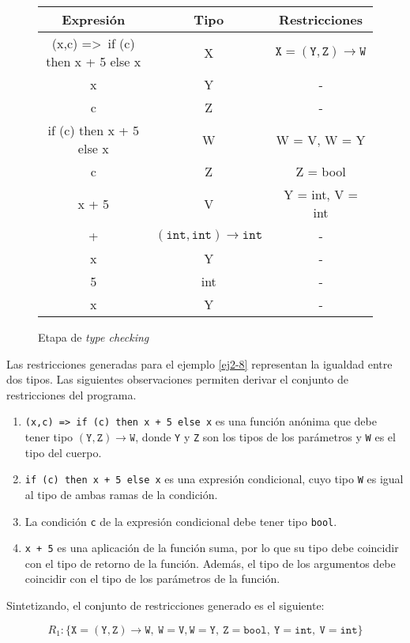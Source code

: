\begin{figure}[ht]
  \centering
  \ttfamily
  \begin{tabular}{c c c}
    Expresión & Tipo & Restricciones\\
    \hline
    (x,c) =>\ if (c) then x + 5 else x & X & $\mathtt{X = (Y,Z) \rightarrow W}$\\
    x & Y & -\\
    c & Z & -\\
    if (c) then x + 5 else x & W & W = V, W = Y\\
    c & Z & Z = bool\\
    x + 5 & V & Y = int, V = int\\
    + & $\mathtt{(int,int) \rightarrow int}$ & -\\
    x & Y & -\\
    5 & int & -\\
    x & Y & -\\
  \end{tabular}
  \caption{Etapa de \emph{type checking}}
  \label{tabla1}
\end{figure}

Las restricciones generadas para el ejemplo \ref{ej2-8} representan la igualdad entre dos tipos. Las siguientes observaciones permiten derivar el conjunto de restricciones del programa.

\begin{enumerate}
  \item \texttt{(x,c) =>\ if (c) then x + 5 else x} es una función anónima que debe tener tipo $\mathtt{(Y,Z) \rightarrow W}$, donde \texttt{Y} y \texttt{Z} son los tipos de los parámetros y \texttt{W} es el tipo del cuerpo.
  \item \texttt{if (c) then x + 5 else x} es una expresión condicional, cuyo tipo \texttt{W} es igual al tipo de ambas ramas de la condición.
  \item La condición \texttt{c} de la expresión condicional debe tener tipo \texttt{bool}.
  \item \texttt{x + 5} es una aplicación de la función suma, por lo que su tipo debe coincidir con el tipo de retorno de la función. Además, el tipo de los argumentos debe coincidir con el tipo de los parámetros de la función.
\end{enumerate}

Sintetizando, el conjunto de restricciones generado es el siguiente:

\[
R_1: \{ \mathtt{X = (Y,Z) \rightarrow W,\ W = V, W = Y,\ Z = bool,\ Y = int,\ V = int} \}
\]

